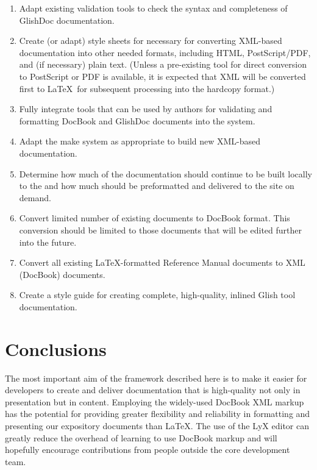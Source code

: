 \begin{enumerate}

\item Adapt existing validation tools to check the syntax and
completeness of GlishDoc documentation.  

\item Create (or adapt) style sheets for necessary for converting
XML-based documentation into other needed formats, including HTML,
PostScript/PDF, and (if necessary) plain text.  (Unless a pre-existing
tool for direct conversion to PostScript or PDF is available, it is
expected that XML will be converted first to \LaTeX\ for subsequent
processing into the hardcopy format.)  

\item Fully integrate tools that can be used by authors for validating
and formatting DocBook and GlishDoc documents into the \aipspp
system.  

\item Adapt the \aipspp make system as appropriate to build new
XML-based documentation.

\item Determine how much of the documentation should continue to be
built locally to the \aipspp and how much should be preformatted and
delivered to the \aipspp site on demand.

\item Convert limited number of existing \aipspp documents to DocBook
format.  This conversion should be limited to those documents that
will be edited further into the future.  

\item Convert all existing \LaTeX-formatted Reference Manual documents
to XML (DocBook) documents.  

\item Create a style guide for creating complete, high-quality,
inlined Glish tool documentation.  

\end{enumerate}

\section{Conclusions}

The most important aim of the framework described here is to make it
easier for developers to create and deliver documentation that is
high-quality not only in presentation but in content.  Employing the
widely-used DocBook XML markup has the potential for providing greater
flexibility and reliability in formatting and presenting our
expository documents than \LaTeX.  The use of the LyX editor can
greatly reduce the overhead of learning to use DocBook markup and will
hopefully encourage contributions from people outside the core
development team.  

